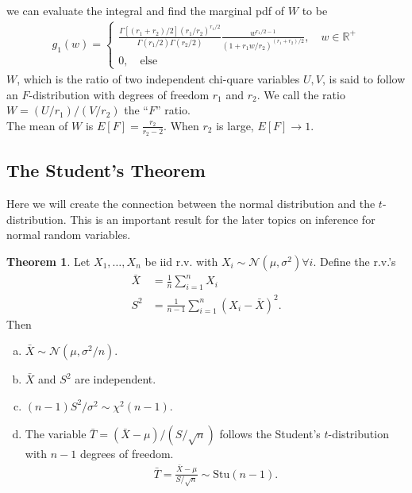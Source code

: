 \documentclass{book}
\theoremstyle{definition}
\newtheorem{thm}{Theorem}[section]
\newcommand{\R}{\mathbb{R}}
\newcommand{\Else}{\text{else}}
\newcommand{\N}{\mathcal{N}}
\newcommand{\f}[2]{\frac{#1}{#2}}
\begin{document}
we can evaluate the integral and find the marginal pdf of $W$ to be 
\begin{align}
g_1(w) = \begin{cases}
\f{\Gamma[(r_1+r_2)/2](r_1/r_2)^{r_1/2}}{\Gamma(r_1/2)\Gamma(r_2/2)}\f{w^{r_1/2-1}}{(1+r_1w/r_2)^{(r_1+r_2)/2}}, \quad w\in \R^+\\
0, \quad \Else
\end{cases}
\end{align}
$W$, which is the ratio of two independent chi-quare variables $U,V$, is said to follow an $F$-distribution with degrees of freedom $r_1$ and $r_2$. We call the ratio $W = (U/r_1)/(V/r_2)$ the ``$F$'' ratio. \\

The mean of $W$ is $E[F] = \f{r_2}{r_2-2}$. When $r_2$ is large, $E[F] \to 1$.  


\subsection{The Student's Theorem}

Here we will create the connection between the normal distribution and the $t$-distribution. This is an important result for the later topics on inference for normal random variables. \\

\begin{thm} Let $X_1, \dots, X_n$ be iid r.v. with $X_i \sim \N(\mu,\sigma^2) \forall i$. Define the r.v.'s
\begin{align}
\bar{X} &= \f{1}{n}\sum^n_{i=1}X_i\\
S^2 &= \f{1}{n-1}\sum^n_{i=1}(X_i - \bar{X})^2.
\end{align}
Then
\begin{enumerate}[(a)]
	\item $\bar{X} \sim \N(\mu, \sigma^2/n)$.
	\item $\bar{X}$ and $S^2$ are independent. 
	\item $(n-1)S^2/\sigma^2 \sim \chi^2(n-1)$.
	\item The variable $\bar{T} = (\bar{X} - \mu)/(S/\sqrt{n})$ follows the Student's $t$-distribution with $n-1$ degrees of freedom. 
	\begin{align}
	\bar{T} = \f{\bar{X} - \mu}{S/\sqrt{n}} \sim \text{Stu}(n-1).
	\end{align}
\end{enumerate}
\end{thm}
\end{document}
